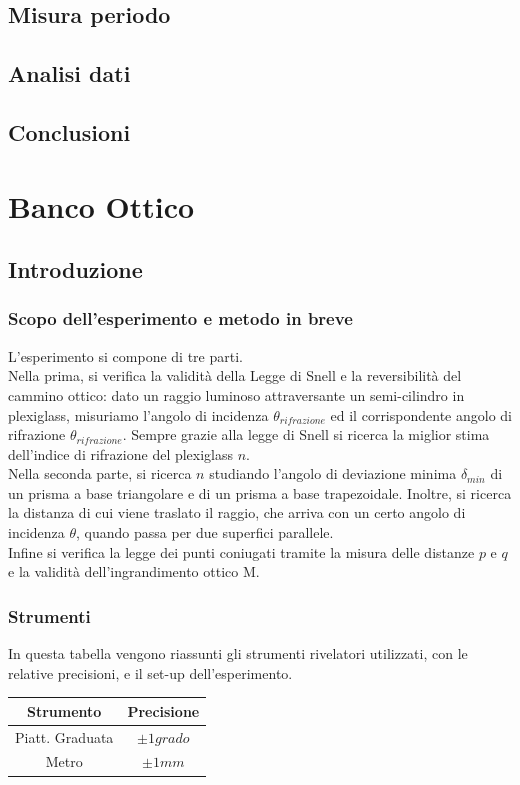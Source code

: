 \documentclass[a4paper,10pt]{report}
\begin{document}
\section{Misura periodo}
\section{Analisi dati}
\section{Conclusioni}

\chapter{Banco Ottico}
\section{Introduzione}
\subsection{Scopo dell'esperimento e metodo in breve}
L'esperimento si compone di tre parti.
\\

Nella prima, si verifica la validità della Legge di Snell e la reversibilità del cammino ottico: dato un raggio luminoso attraversante un semi-cilindro in plexiglass, misuriamo l'angolo di incidenza $\theta_{rifrazione}$ ed il corrispondente  angolo di rifrazione $\theta_{rifrazione}$. Sempre grazie alla legge di Snell si ricerca la miglior stima dell'indice di rifrazione del plexiglass $n$.
\\

Nella seconda parte, si ricerca $n$ studiando l'angolo di deviazione minima $\delta_{min}$ di un prisma a base triangolare e di un prisma a base trapezoidale. 
Inoltre, si ricerca la distanza di cui viene traslato il raggio, che arriva con un certo angolo di incidenza $\theta$, quando passa per due superfici parallele.
\\

Infine si verifica la legge dei punti coniugati tramite la misura delle distanze $p$ e $q$ e la validità dell'ingrandimento ottico M. 

\subsection{Strumenti}
In questa tabella vengono riassunti gli strumenti rivelatori utilizzati, con le relative precisioni, e il set-up dell'esperimento.\\
\begin{center}
\begin{tabular}{c|c}
Strumento & Precisione \\
\midrule
Piatt. Graduata & $\pm 1 grado $ \\
Metro & $\pm 1 mm $\\
\end{tabular}
\end{center}
\end{document}
